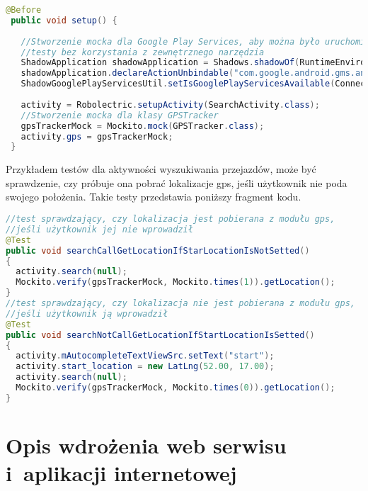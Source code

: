 \documentclass[eng,archivemode]{mgr}
\begin{document}
\begin{lstlisting}[language=java, caption={Inicjalizowanie testów}, label=lst:setup]
 @Before
 public void setup() {
 
   //Stworzenie mocka dla Google Play Services, aby można było uruchomić
   //testy bez korzystania z zewnętrznego narzędzia
   ShadowApplication shadowApplication = Shadows.shadowOf(RuntimeEnvironment.application);
   shadowApplication.declareActionUnbindable("com.google.android.gms.analytics.service.START");
   ShadowGooglePlayServicesUtil.setIsGooglePlayServicesAvailable(ConnectionResult.API_UNAVAILABLE);
 
   activity = Robolectric.setupActivity(SearchActivity.class);
   //Stworzenie mocka dla klasy GPSTracker
   gpsTrackerMock = Mockito.mock(GPSTracker.class);
   activity.gps = gpsTrackerMock;
 }
\end{lstlisting}

Przykładem testów dla aktywności wyszukiwania przejazdów, może być sprawdzenie, czy próbuje ona pobrać lokalizacje gps, jeśli użytkownik nie poda swojego położenia. Takie testy przedstawia poniższy fragment kodu.

\begin{lstlisting}[language=java, caption={Testy wywołania funkcji pobierającej lokalizacje}, label=lst:gps_test]
//test sprawdzający, czy lokalizacja jest pobierana z modułu gps,
//jeśli użytkownik jej nie wprowadził
@Test
public void searchCallGetLocationIfStarLocationIsNotSetted()
{
  activity.search(null);
  Mockito.verify(gpsTrackerMock, Mockito.times(1)).getLocation();
}
//test sprawdzający, czy lokalizacja nie jest pobierana z modułu gps,
//jeśli użytkownik ją wprowadził
@Test
public void searchNotCallGetLocationIfStartLocationIsSetted()
{
  activity.mAutocompleteTextViewSrc.setText("start");
  activity.start_location = new LatLng(52.00, 17.00);
  activity.search(null);
  Mockito.verify(gpsTrackerMock, Mockito.times(0)).getLocation();
}
\end{lstlisting}

\chapter{Opis wdrożenia web serwisu i~aplikacji internetowej}
\end{document}
